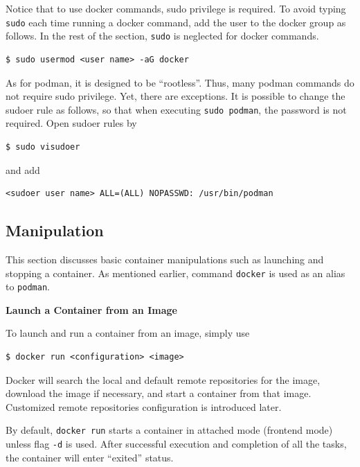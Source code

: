 Notice that to use docker commands, sudo privilege is required. To avoid typing \verb|sudo| each time running a docker command, add the user to the docker group as follows. In the rest of the section, \verb|sudo| is neglected for docker commands.
\begin{lstlisting}
$ sudo usermod <user name> -aG docker
\end{lstlisting}
As for podman, it is designed to be ``rootless''. Thus, many podman commands do not require sudo privilege. Yet, there are exceptions. It is possible to change the sudoer rule as follows, so that when executing \verb|sudo podman|, the password is not required. Open sudoer rules by
\begin{lstlisting}
$ sudo visudoer
\end{lstlisting}
and add
\begin{lstlisting}
<sudoer user name> ALL=(ALL) NOPASSWD: /usr/bin/podman
\end{lstlisting}

\subsection{Manipulation} \label{sec:docker-manipulation}

This section discusses basic container manipulations such as launching and stopping a container. As mentioned earlier, command \verb|docker| is used as an alias to \verb|podman|.

\vspace{0.1in}
\noindent \textbf{Launch a Container from an Image}
\vspace{0.1in}

To launch and run a container from an image, simply use
\begin{lstlisting}
$ docker run <configuration> <image>
\end{lstlisting}
Docker will search the local and default remote repositories for the image, download the image if necessary, and start a container from that image. Customized remote repositories configuration is introduced later.

By default, \verb|docker run| starts a container in attached mode (frontend mode) unless flag \verb|-d| is used. After successful execution and completion of all the tasks, the container will enter ``exited'' status. 


